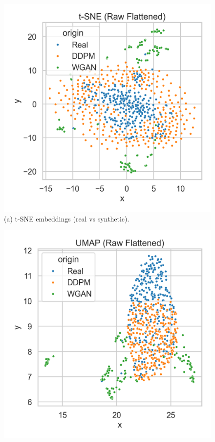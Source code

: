 \documentclass{article}
\begin{document}
\begin{figure}[t]
  \centering
  \begin{minipage}[t]{0.49\linewidth}
    \centering
    \includegraphics[width=\linewidth]{figs/embedding_tsne.png}\\
    \small (a) t\mbox{-}SNE embeddings (real vs synthetic).
  \end{minipage}\hfill
  \begin{minipage}[t]{0.49\linewidth}
    \centering
    \includegraphics[width=\linewidth]{figs/embedding_umap.png}\\

\end{minipage}
\end{figure}
\end{document}
